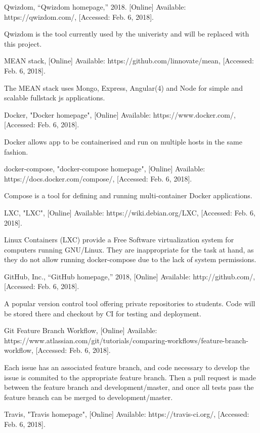 \documentclass[11pt,fleqn,twoside]{article}
\begin{document}
\begin{thebibliography}{1}

 Qwizdom, “Qwizdom homepage,” 2018. [Online] Available: https://qwizdom.com/, [Accessed: Feb. 6, 2018].

  Qwizdom is the tool currently used by the univeristy and will be replaced with this project.

 MEAN stack, [Online] Available: https://github.com/linnovate/mean, [Accessed: Feb. 6, 2018].

  The MEAN stack uses Mongo, Express, Angular(4) and Node for simple and scalable fullstack js applications.

 Docker, "Docker homepage", [Online] Available: https://www.docker.com/, [Accessed: Feb. 6, 2018].

  Docker allows app to be containerised and run on multiple hosts in the same fashion.

 docker-compose, "docker-compose homepage", [Online] Available: https://docs.docker.com/compose/, [Accessed: Feb. 6, 2018].

  Compose is a tool for defining and running multi-container Docker applications.

 LXC, "LXC", [Online] Available: https://wiki.debian.org/LXC, [Accessed: Feb. 6, 2018].

  Linux Containers (LXC) provide a Free Software virtualization system for computers running GNU/Linux. They are inappropriate
  for the task at hand, as they do not allow running docker-compose due to the lack of system permissions.

 GitHub, Inc., “GitHub homepage,” 2018, [Online] Available: http://github.com/, [Accessed: Feb. 6, 2018].

  A popular version control tool offering private repositories to students. Code will be stored there and checkout by CI for
  testing and deployment.

 Git Feature Branch Workflow, [Online] Available: https://www.atlassian.com/git/tutorials/comparing-workflows/feature-branch-workflow, [Accessed: Feb. 6, 2018].

  Each issue has an associated feature branch, and code necessary to develop the issue is commited to the appropriate feature branch.
  Then a pull request is made between the feature branch and development/master, and once all tests pass the feature branch can
  be merged to development/master.

 Travis, "Travis homepage", [Online] Available: https://travis-ci.org/, [Accessed: Feb. 6, 2018].


\end{thebibliography}
\end{document}
